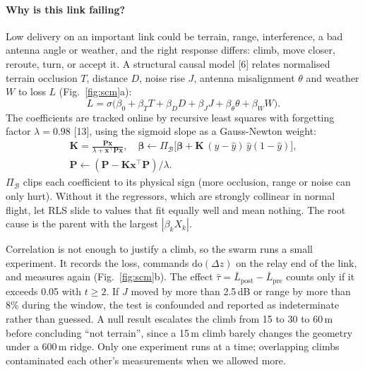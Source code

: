 \documentclass[10pt,a4paper,twocolumn]{article}
\begin{document}
\paragraph{Why is this link failing?} Low delivery on an important link could be terrain, range, interference, a bad antenna angle or weather, and the right response differs: climb, move closer, reroute, turn, or accept it. A structural causal model [6] relates normalised terrain occlusion $T$, distance $D$, noise rise $J$, antenna misalignment $\theta$ and weather $W$ to loss $L$ (Fig.~\ref{fig:scm}a):
\begin{equation}
L=\sigma\big(\beta_0+\beta_T T+\beta_D D+\beta_J J+\beta_\theta\theta+\beta_W W\big).
\label{eq:scm}
\end{equation}
The coefficients are tracked online by recursive least squares with forgetting factor $\lambda=0.98$ [13], using the sigmoid slope as a Gauss-Newton weight:
\begin{gather}
\mathbf K=\frac{\mathbf P\mathbf x}{\lambda+\mathbf x^\top\mathbf P\mathbf x},\quad
\boldsymbol\beta\leftarrow\Pi_{\mathcal B}\big[\boldsymbol\beta+\mathbf K\,(y-\hat y)\,\hat y(1-\hat y)\big],\label{eq:rls}\\
\mathbf P\leftarrow(\mathbf P-\mathbf K\mathbf x^\top\mathbf P)/\lambda .\nonumber
\end{gather}
$\Pi_{\mathcal B}$ clips each coefficient to its physical sign (more occlusion, range or noise can only hurt). Without it the regressors, which are strongly collinear in normal flight, let RLS slide to values that fit equally well and mean nothing. The root cause is the parent with the largest $|\beta_k X_k|$.

Correlation is not enough to justify a climb, so the swarm runs a small experiment. It records the loss, commands $\mathrm{do}(\Delta z)$ on the relay end of the link, and measures again (Fig.~\ref{fig:scm}b). The effect $\hat\tau=\bar L_{\mathrm{post}}-\bar L_{\mathrm{pre}}$ counts only if it exceeds 0.05 with $t\ge2$. If $J$ moved by more than 2.5\,dB or range by more than 8\% during the window, the test is confounded and reported as indeterminate rather than guessed. A null result escalates the climb from 15 to 30 to 60\,m before concluding ``not terrain'', since a 15\,m climb barely changes the geometry under a 600\,m ridge. Only one experiment runs at a time; overlapping climbs contaminated each other's measurements when we allowed more.
\end{document}
